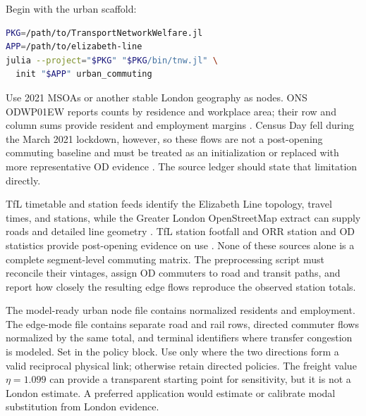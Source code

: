 Begin with the urban scaffold:
\begin{lstlisting}[language=bash]
PKG=/path/to/TransportNetworkWelfare.jl
APP=/path/to/elizabeth-line
julia --project="$PKG" "$PKG/bin/tnw.jl" \
  init "$APP" urban_commuting
\end{lstlisting}
Use 2021 MSOAs or another stable London geography as nodes. ONS ODWP01EW
reports counts by residence and workplace area; their row and column sums
provide resident and employment margins \citep{ONS2021WorkplaceFlows}. Census
Day fell during the
March 2021 lockdown, however, so these flows are not a post-opening commuting
baseline and must be treated as an initialization or replaced with more
representative OD evidence \citep{ONS2021TravelWorkQuality}. The source ledger
should state that limitation directly.

TfL timetable and station feeds identify the Elizabeth Line topology, travel
times, and stations, while the Greater London OpenStreetMap extract can supply
roads and detailed line geometry \citep{TfLOpenData,GeofabrikGreaterLondon}.
TfL station footfall and ORR station and OD statistics provide post-opening
evidence on use \citep{TfLNetworkDemand,ORRStationUsage2024}. None of these
sources alone is a complete segment-level commuting matrix. The preprocessing
script must reconcile their vintages, assign OD commuters to road and transit
paths, and report how closely the resulting edge flows reproduce the observed
station totals.

The model-ready urban node file contains normalized residents and employment.
The edge-mode file contains separate road and rail rows, directed commuter
flows normalized by the same total, and terminal identifiers where transfer
congestion is modeled. Set \code{mode = "rail"} in the policy block. Use
\code{unit = "both"} only where the two directions form a valid reciprocal
physical link; otherwise retain directed policies. The freight value
\(\eta=1.099\) can provide a transparent starting point for sensitivity, but
it is not a London estimate. A preferred application would estimate or
calibrate modal substitution from London evidence.

